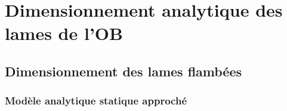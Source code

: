 
\appendix
\renewcommand\chaptername{Annexe~}

\lhead[\fancyplain{}{\leftmark}]%
      {\fancyplain{}{}} %
\chead[\fancyplain{}{}]%
      {\fancyplain{}{}}
\rhead[\fancyplain{}{}]%
      {\fancyplain{}{\rightmark}}%
\lfoot[\fancyplain{}{}]%
      {\fancyplain{}{}}
\cfoot[\fancyplain{}{\thepage}]%
      {\fancyplain{}{\thepage}} %
\rfoot[\fancyplain{}{}]%
     {\fancyplain{}{\scriptsize}}



\chapter{Dimensionnement analytique des lames de l'OB}
\label{Ann:5_Dimensionnement analytique des lames de l'OB}

\minitoc
\newpage

	\section{Dimensionnement des lames flambées}
	\label{sec:4.3:Dimensionnement des lames flambées}
	\subsection{Modèle analytique statique approché} 
